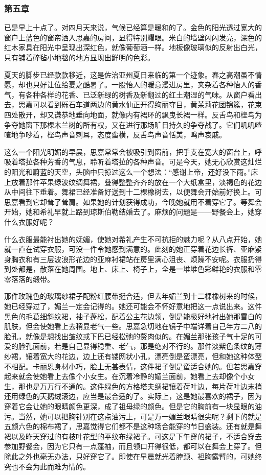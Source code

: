 \subsubsection{第五章}


\par 已是早上十点了。对四月天来说，气候已经算是暖和的了。金色的阳光透过宽大的窗户上蓝色的窗帘洒入思嘉的房间，显得特别耀眼。米白的墙壁闪闪发亮，深色的红木家具在阳光中呈现出深红色，就像葡萄酒一样。地板像玻璃似的反射出白光，只有铺着碎毡小地毯的地方显现出鲜明的色彩。
\par 夏天的脚步已经款款移近，这是佐治亚州夏日来临的第一个迹象。春之高潮虽不情愿，却也只好让位给夏之酷暑了。一股怡人的暖意漫进房里，夹杂着各种怡人的香气，有各种各样的花香、已泛新绿的树香及新翻过的红土潮湿的气味。从窗户看出去，思嘉可以看到砾石车道两边的黄水仙正开得绚丽夺目，黄茉莉花团锦簇，花束四处散开，却又谦恭地垂向地面，就像内有裙环的飘曳长裙一样。反舌鸟和㭴鸟为争夺她窗下那棵木兰树的所有权，又在进行那场旷日持久的争夺战了。它们叽叽喳喳地争吵着，㭴鸟声音刺耳，态度蛮横，反舌鸟声音恬美，鸣声哀戚。
\par 这么一个阳光明媚的早晨，思嘉常常会被吸引到窗前，把手支在宽大的窗台上，呼吸着塔拉各种芳香的气息，聆听着塔拉的各种声音。可是今天，她无心欣赏这灿烂的阳光和蔚蓝的天空，头脑中只掠过这么一个想法：“感谢上帝，还好没下雨。”床上放着那件苹果绿波纹绸舞裙，叠得整整齐齐的放在一个大纸盒里，淡褐色的花边从中间往下垂着。舞裙已经准备好送到十二棵橡树去，以便舞会开始前好换上。可思嘉看到它却耸了耸肩。如果她的计划获得成功，今晚她就用不着穿它了。等舞会开始，她和希礼早就上路到琼斯伯勒结婚去了。麻烦的问题是——野餐会上，她穿什么衣服好呢？
\par 什么衣服最能衬出她的妩媚，使她对希礼产生不可抗拒的魅力呢？从八点开始，她就一直在试穿衣服，可没一件令她感到满意的。此刻的她正穿着花边长裤、亚麻紧身胸衣和有三层波浪形花边的亚麻衬裙站在房里满心沮丧、烦躁不安呢。衣服扔得到处都是，散落在她周围。地上、床上、椅子上，全是一堆堆色彩鲜艳的衣服和零零落落的缎带。
\par 那件玫瑰色的玻璃纱裙子配粉红腰带挺合适，但去年媚兰到十二棵橡树来的时候，她已经穿过了，媚兰一定会记得的。她还可能会不怀好意地把这一点说出来。这件黑色的毛葛细斜纹裙，袖子蓬松，配着公主花边领，倒是能极好地衬出她那雪白的肌肤，但会使她看上去稍显老气一些。思嘉急切地在镜子中端详着自己年方二八的脸孔，就像是想找出皱纹或下巴已经松弛的赘肉似的。在媚兰那张孩子气十足的可爱的脸孔面前，若是自己显得稳重、老气，那是绝对不行的。那件淡紫色条纹的薄纱裙，镶着宽大的花边，边上还有镂网状小孔，漂亮倒是蛮漂亮，但和她这种体型不相配。卡丽恩身材小巧，脸上无甚表情，这件裙子倒是蛮适合她的。但若思嘉穿起来就会使她看上去像个小女生。在沉着冷静的媚兰面前，她看上去却像个小女生，那也是万万行不通的。这件绿色的方格塔夫绸裙镶着荷叶边，每片荷叶边末梢还用绿色的天鹅绒滚边，应当是最合适的了。实际上，这是她最喜欢的裙子，因为穿着它会让她的眼睛颜色更深，成了祖母绿的颜色。但是它的胸前有一块显眼的油污。当然，她可以把胸针别在这点油污上，可是万一媚兰眼睛很尖呢？剩下的就是五颜六色的棉布裙了，思嘉觉得它们都不是这种场合能穿的节日盛装。还有就是舞裙以及昨天穿过的有枝叶花型的平纹布绿裙子。可这是下午穿的裙子，不适合穿去参加野餐会，因为它只有一点蓬袖，而且领口开得很低，都可以在舞会上穿了。但除此之外也毫无办法，只好穿它了。即使在早晨就光着脖颈、袒胸露臂的，可她终究也不会为此而难为情的。
